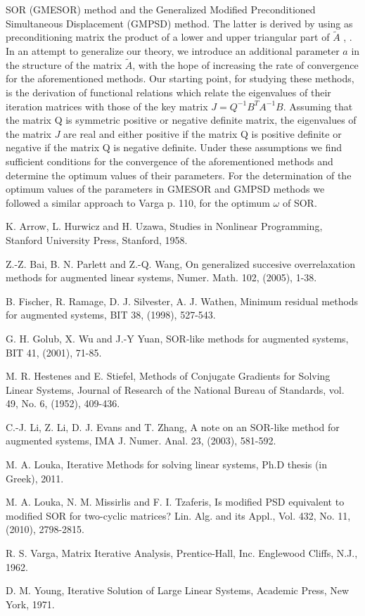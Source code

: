 \documentclass{report}
\begin{document}
SOR (GMESOR) method and the Generalized Modified Preconditioned
Simultaneous Displacement (GMPSD) method. The latter is derived by using
as preconditioning matrix the product of a lower and upper triangular
part of $\tilde A$ \cite{Louka}, \cite{LoukMis2}.
In an attempt to generalize our theory, we introduce an additional
parameter $a$ in the structure of the matrix $\tilde A$, with the hope of
increasing the rate of convergence for the aforementioned methods. Our
starting point, for studying these methods, is the derivation of
functional relations which relate the eigenvalues of their iteration
matrices with those of the key matrix $J=Q^{-1}B^TA^{-1}B$. Assuming that
the matrix Q is symmetric positive or negative definite matrix, the
eigenvalues of the matrix $J$ are real and either positive if the matrix
Q is positive definite or negative if the matrix Q is negative definite.
Under these assumptions we find sufficient conditions for the convergence
of the aforementioned methods and determine the optimum values of their
parameters. For the determination of the optimum values of the parameters
in GMESOR and GMPSD methods we followed a similar approach to Varga
\cite{Var1} p. 110, for the optimum $\omega$ of SOR.




 K. Arrow, L. Hurwicz and H. Uzawa, Studies in
Nonlinear Programming, Stanford University Press, Stanford, 1958.

 Z.-Z. Bai, B. N. Parlett and Z.-Q. Wang, On
generalized succesive overrelaxation methods for augmented linear
systems, Numer. Math. 102, (2005), 1-38.




 B. Fischer, R. Ramage, D. J. Silvester, A. J.
Wathen, Minimum residual methods for augmented systems, BIT 38, (1998),
527-543.


 G. H. Golub, X. Wu and J.-Y Yuan, SOR-like
methods for augmented systems, BIT 41, (2001), 71-85.


 M. R. Hestenes and E. Stiefel, Methods of Conjugate
Gradients for Solving Linear Systems, Journal of Research of the National
Bureau of Standards, vol. 49, No. 6, (1952), 409-436.


 C.-J. Li, Z. Li, D. J. Evans and T. Zhang, A
note on an SOR-like method for augmented
systems, IMA J. Numer. Anal. 23, (2003), 581-592.

 M. A. Louka, Iterative Methods for solving linear
systems, Ph.D thesis (in Greek), 2011.

 M. A. Louka, N. M. Missirlis and F. I. Tzaferis, Is
modified PSD equivalent to modified SOR for two-cyclic matrices? Lin.
Alg. and its Appl., Vol. 432, No. 11, (2010), 2798-2815.


 R. S. Varga, Matrix Iterative Analysis, Prentice-Hall, Inc.
Englewood Cliffs, N.J., 1962.





 D. M. Young, Iterative Solution of Large Linear Systems,
Academic Press, New York, 1971.
\end{document}
